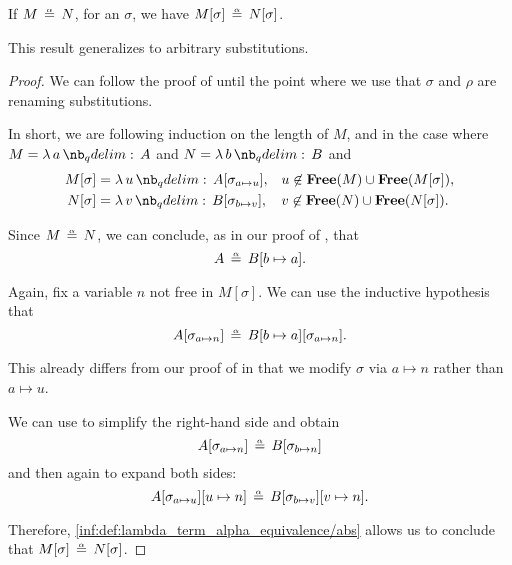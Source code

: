 \begin{proposition}\label{thm:substitution_on_alpha_equivalent_terms}
  If \( M \aequiv N \), for an \hyperref[def:lambda_substitution]{} \( \sigma \), we have \( M[\sigma] \aequiv N[\sigma] \).
\end{proposition}
\begin{comments}
  \item This result generalizes  to arbitrary substitutions.
\end{comments}
\begin{proof}
  We can follow the proof of  until the point where we use that \( \sigma \) and \( \rho \) are renaming substitutions.

  In short, we are following induction on the length of \( M \), and in the case where \( M = \qabs a A \) and \( N = \qabs b B \) and
  \begin{align*}
    M[\sigma] &= \qabs u A[\sigma_{a \mapsto u}], &&u \not\in \op*{Free}(M) \cup \op*{Free}(M[\sigma]), \\
    N[\sigma] &= \qabs v B[\sigma_{b \mapsto v}], &&v \not\in \op*{Free}(N) \cup \op*{Free}(N[\sigma]).
  \end{align*}

  Since \( M \aequiv N \), we can conclude, as in our proof of , that
  \begin{equation*}
    A \aequiv B[b \mapsto a].
  \end{equation*}

  Again, fix a variable \( n \) not free in \( M[\sigma] \). We can use the inductive hypothesis that
  \begin{equation*}
    A[\sigma_{a \mapsto n}] \aequiv B[b \mapsto a][\sigma_{a \mapsto n}].
  \end{equation*}

  This already differs from our proof of  in that we modify \( \sigma \) via \( a \mapsto n \) rather than \( a \mapsto u \).

  We can use  to simplify the right-hand side and obtain
  \begin{equation*}
    A[\sigma_{a \mapsto n}] \aequiv B[\sigma_{b \mapsto n}]
  \end{equation*}
  and then again to expand both sides:
  \begin{equation*}
    A[\sigma_{a \mapsto u}][u \mapsto n] \aequiv B[\sigma_{b \mapsto v}][v \mapsto n].
  \end{equation*}

  Therefore, \ref{inf:def:lambda_term_alpha_equivalence/abs} allows us to conclude that \( M[\sigma] \aequiv N[\sigma] \).
\end{proof}

